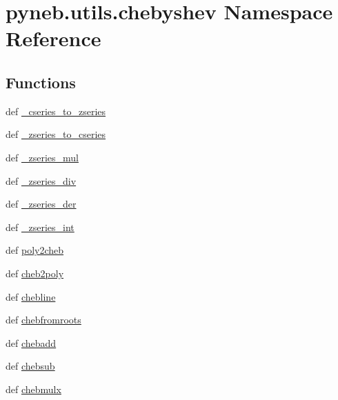 \hypertarget{namespacepyneb_1_1utils_1_1chebyshev}{\section{pyneb.\-utils.\-chebyshev Namespace Reference}
\label{namespacepyneb_1_1utils_1_1chebyshev}
}
\subsection*{Functions}
\begin{DoxyCompactItemize}
\item 
def \hyperlink{namespacepyneb_1_1utils_1_1chebyshev_a3340d022485b954c9c722b6eaa456ebb}{\-\_\-cseries\-\_\-to\-\_\-zseries}
\item 
def \hyperlink{namespacepyneb_1_1utils_1_1chebyshev_aa21c9418f1740d12b80ab1563f49ce0b}{\-\_\-zseries\-\_\-to\-\_\-cseries}
\item 
def \hyperlink{namespacepyneb_1_1utils_1_1chebyshev_ac430f61f52899c1e2a276d8b76fa47d5}{\-\_\-zseries\-\_\-mul}
\item 
def \hyperlink{namespacepyneb_1_1utils_1_1chebyshev_a9ec3445ca77071adc655bacf9299c451}{\-\_\-zseries\-\_\-div}
\item 
def \hyperlink{namespacepyneb_1_1utils_1_1chebyshev_a82377769dc2ed2e38828ac99897ff554}{\-\_\-zseries\-\_\-der}
\item 
def \hyperlink{namespacepyneb_1_1utils_1_1chebyshev_ac55f3063cff69831a2882a7a30b617d7}{\-\_\-zseries\-\_\-int}
\item 
def \hyperlink{namespacepyneb_1_1utils_1_1chebyshev_abd824b0c3e5e2cc0f9464a0986dc3819}{poly2cheb}
\item 
def \hyperlink{namespacepyneb_1_1utils_1_1chebyshev_a0e43853c4c6b0f440005cc6b5124557e}{cheb2poly}
\item 
def \hyperlink{namespacepyneb_1_1utils_1_1chebyshev_ab88a5c9a7faa4458231ddb2edc1aa860}{chebline}
\item 
def \hyperlink{namespacepyneb_1_1utils_1_1chebyshev_ad3dc62fdecc545593e36509daa1c2632}{chebfromroots}
\item 
def \hyperlink{namespacepyneb_1_1utils_1_1chebyshev_aafceea7ad9a5a18707fcf493bcf70457}{chebadd}
\item 
def \hyperlink{namespacepyneb_1_1utils_1_1chebyshev_a2ca3ca3bac02e30625edb4c48ada7ddf}{chebsub}
\item 
def \hyperlink{namespacepyneb_1_1utils_1_1chebyshev_a91d78fa31041dfe9ccf7bbc0891809b3}{chebmulx}

\end{DoxyCompactItemize}
